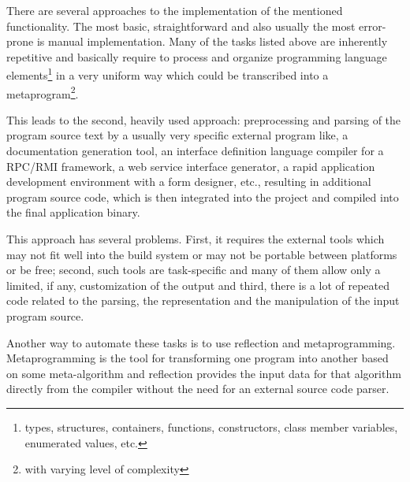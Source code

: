 There are several approaches to the implementation of the mentioned functionality.
The most basic, straightforward and also usually the most
error-prone is manual implementation. Many of the tasks listed above
are inherently repetitive and basically require to process and organize
programming language elements\footnote{types, structures, containers, functions,
constructors, class member variables, enumerated values, etc.}
in a very uniform way which could be transcribed into a metaprogram\footnote{with
varying level of complexity}.

This leads to the second, heavily used approach: preprocessing
and parsing of the program source text by a usually very specific external
program like, a documentation generation tool, an interface definition language
compiler for a RPC/RMI framework, a web service interface generator,
a rapid application development environment with a form designer, etc.,
resulting in additional program source code, which is then integrated into
the project and compiled into the final application binary.

This approach has several problems. First, it requires the external
tools which may not fit well into the build system or may not be portable
between platforms or be free; second, such tools are task-specific
and many of them allow only a limited, if any, customization of the output
and third, there is a lot of repeated code related to the parsing, the
representation and the manipulation of the input program source.

Another way to automate these tasks is to use reflection and metaprogramming.
Metaprogramming is the tool for transforming one program into another based
on some meta-algorithm and reflection provides the input data for that algorithm
directly from the compiler without the need for an external source code parser.


